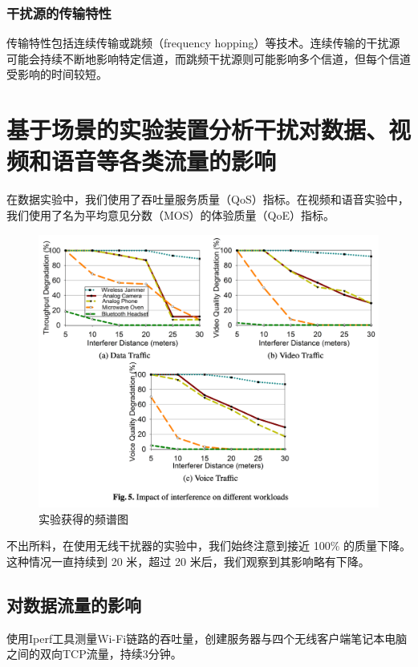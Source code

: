 \subsubsection{干扰源的传输特性}

传输特性包括连续传输或跳频（frequency hopping）等技术。连续传输的干扰源可能会持续不断地影响特定信道，而跳频干扰源则可能影响多个信道，但每个信道受影响的时间较短。

\section{基于场景的实验装置分析干扰对数据、视频和语音等各类流量的影响}

在数据实验中，我们使用了吞吐量服务质量（QoS）指标。在视频和语音实验中，我们使用了名为平均意见分数（MOS）的体验质量（QoE）指标。

\begin{figure}[h]
    \centering
    \includegraphics[width=15cm]{res/wifi4.png}
    \caption{实验获得的频谱图}
\end{figure}

不出所料，在使用无线干扰器的实验中，我们始终注意到接近 100\% 的质量下降。这种情况一直持续到 20 米，超过 20 米后，我们观察到其影响略有下降。

\subsection{对数据流量的影响}

使用Iperf工具测量Wi-Fi链路的吞吐量，创建服务器与四个无线客户端笔记本电脑之间的双向TCP流量，持续3分钟。

